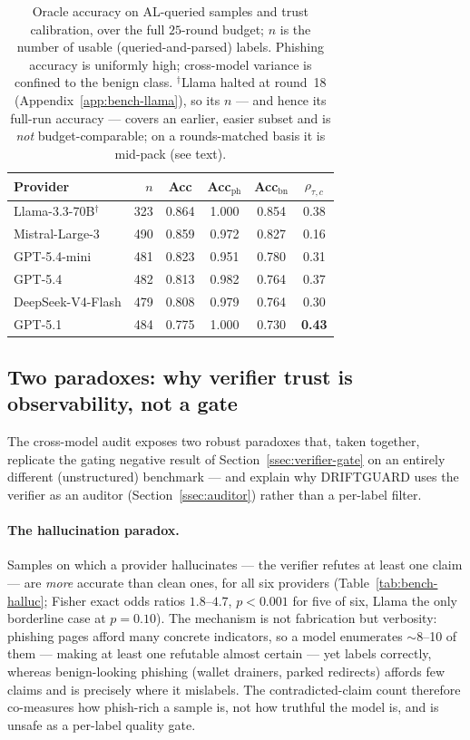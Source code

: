 \begin{table}[h]
\centering
\caption{Oracle accuracy on AL-queried samples and trust calibration, over the
full $25$-round budget; $n$ is the number of usable (queried-and-parsed) labels.
Phishing accuracy is uniformly high; cross-model variance is confined to the
benign class. $^{\dagger}$Llama halted at round~18
(Appendix~\ref{app:bench-llama}), so its $n$ --- and hence its full-run accuracy
--- covers an earlier, easier subset and is \emph{not} budget-comparable; on a
rounds-matched basis it is mid-pack (see text).}
\label{tab:bench-acc}
\small
\begin{tabular}{@{}lrcccc@{}}
\toprule
Provider & $n$ & Acc & Acc$_{\text{ph}}$ & Acc$_{\text{bn}}$ & $\rho_{\tau,c}$ \\
\midrule
Llama-3.3-70B$^{\dagger}$ & 323 & 0.864 & 1.000 & 0.854 & 0.38 \\
Mistral-Large-3   & 490 & 0.859 & 0.972 & 0.827 & 0.16 \\
GPT-5.4-mini      & 481 & 0.823 & 0.951 & 0.780 & 0.31 \\
GPT-5.4           & 482 & 0.813 & 0.982 & 0.764 & 0.37 \\
DeepSeek-V4-Flash & 479 & 0.808 & 0.979 & 0.764 & 0.30 \\
GPT-5.1           & 484 & 0.775 & 1.000 & 0.730 & \textbf{0.43} \\
\bottomrule
\end{tabular}
\end{table}

\subsection{Two paradoxes: why verifier trust is observability, not a gate}
\label{app:bench-paradox}

The cross-model audit exposes two robust paradoxes that, taken together, replicate
the gating negative result of Section~\ref{ssec:verifier-gate} on an entirely
different (unstructured) benchmark --- and explain why DRIFTGUARD uses the
verifier as an auditor (Section~\ref{ssec:auditor}) rather than a per-label
filter.

\paragraph{The hallucination paradox.} Samples on which a provider hallucinates
--- the verifier refutes at least one claim --- are \emph{more} accurate than
clean ones, for all six providers (Table~\ref{tab:bench-halluc}; Fisher exact
odds ratios $1.8$--$4.7$, $p<0.001$ for five of six, Llama the only borderline
case at $p=0.10$). The mechanism is not fabrication but verbosity: phishing pages
afford many concrete indicators, so a model enumerates $\sim$8--10 of them ---
making at least one refutable almost certain --- yet labels correctly, whereas
benign-looking phishing (wallet drainers, parked redirects) affords few claims and
is precisely where it mislabels. The contradicted-claim count therefore co-measures
how phish-rich a sample is, not how truthful the model is, and is unsafe as a
per-label quality gate.

